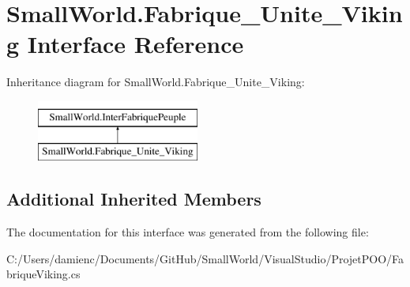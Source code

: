 \hypertarget{interface_small_world_1_1_fabrique___unite___viking}{\section{Small\-World.\-Fabrique\-\_\-\-Unite\-\_\-\-Viking Interface Reference}
\label{interface_small_world_1_1_fabrique___unite___viking}
}
Inheritance diagram for Small\-World.\-Fabrique\-\_\-\-Unite\-\_\-\-Viking\-:\begin{figure}[H]
\begin{center}
\leavevmode
\includegraphics[height=2.000000cm]{interface_small_world_1_1_fabrique___unite___viking}
\end{center}
\end{figure}
\subsection*{Additional Inherited Members}


The documentation for this interface was generated from the following file\-:\begin{DoxyCompactItemize}
\item 
C\-:/\-Users/damienc/\-Documents/\-Git\-Hub/\-Small\-World/\-Visual\-Studio/\-Projet\-P\-O\-O/Fabrique\-Viking.\-cs\end{DoxyCompactItemize}
